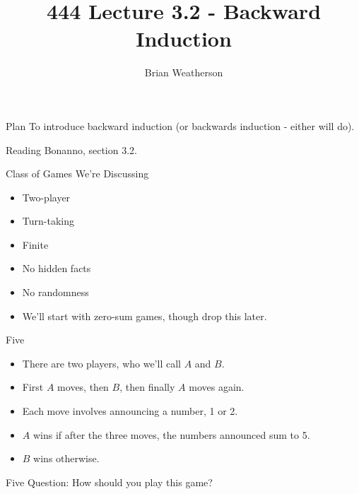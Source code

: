 \documentclass[
  ignorenonframetext,
]{beamer}
\title{444 Lecture 3.2 - Backward Induction}
\author{Brian Weatherson}
\date{}
\providecommand{\tightlist}{%
  \setlength{\itemsep}{0pt}\setlength{\parskip}{0pt}}
\begin{document}
\frame{\titlepage}

\begin{frame}{Plan}
\protect\hypertarget{plan}{}
To introduce backward induction (or backwards induction - either will
do).
\end{frame}

\begin{frame}{Reading}
\protect\hypertarget{reading}{}
Bonanno, section 3.2.
\end{frame}

\begin{frame}{Class of Games We're Discussing}
\protect\hypertarget{class-of-games-were-discussing}{}
\begin{itemize}[<+->]
\tightlist
\item
  Two-player
\item
  Turn-taking
\item
  Finite
\item
  No hidden facts
\item
  No randomness
\item
  We'll start with zero-sum games, though drop this later.
\end{itemize}
\end{frame}

\begin{frame}{Five}
\protect\hypertarget{five}{}
\begin{itemize}
\tightlist
\item
  There are two players, who we'll call \(A\) and \(B\).
\item
  First \(A\) moves, then \(B\), then finally \(A\) moves again.
\item
  Each move involves announcing a number, 1 or 2.
\item
  \(A\) wins if after the three moves, the numbers announced sum to 5.
\item
  \(B\) wins otherwise.
\end{itemize}
\end{frame}

\begin{frame}{Five}
\protect\hypertarget{five-1}{}
Question: How should you play this game?
\end{frame}
\end{document}
